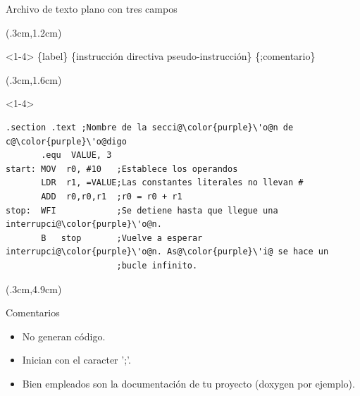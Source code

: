 \documentclass[usenames,table,dvipsnames,aspectratio=169]{beamer}
\begin{document}
\begin{frame}[fragile]{Archivo de texto plano con tres campos}
 \begin{textblock*}{\textwidth}(.3cm,1.2cm)
  \begin{onlyenv}<1-4>
   \{label\} \{instrucción \textbar directiva \textbar pseudo-instrucción\} \{;comentario\}
  \end{onlyenv}
 \end{textblock*}
 \begin{textblock*}{\textwidth}(.3cm,1.6cm)
  \begin{onlyenv}<1-4>
   \begin{lstlisting}[escapechar=\@,]
       .section .text ;Nombre de la secci@\color{purple}\'o@n de c@\color{purple}\'o@digo
       .equ  VALUE, 3     
start: MOV  r0, #10   ;Establece los operandos
       LDR  r1, =VALUE;Las constantes literales no llevan #
       ADD  r0,r0,r1  ;r0 = r0 + r1
stop:  WFI            ;Se detiene hasta que llegue una interrupci@\color{purple}\'o@n.
       B   stop       ;Vuelve a esperar interrupci@\color{purple}\'o@n. As@\color{purple}\'i@ se hace un 
                      ;bucle infinito. 
  \end{lstlisting}
 \end{onlyenv}
\end{textblock*}
\begin{textblock*}{\textwidth}(.3cm,4.9cm)   
 \begin{block}{Comentarios}
   \begin{itemize}[<+(1)->] \justifying
    \item No generan código.
    \item Inician con el caracter ';'.
    \item Bien empleados son la documentación de tu proyecto (doxygen por ejemplo).
   \end{itemize}
  \end{block}
 \end{textblock*}
\end{frame}
\end{document}
